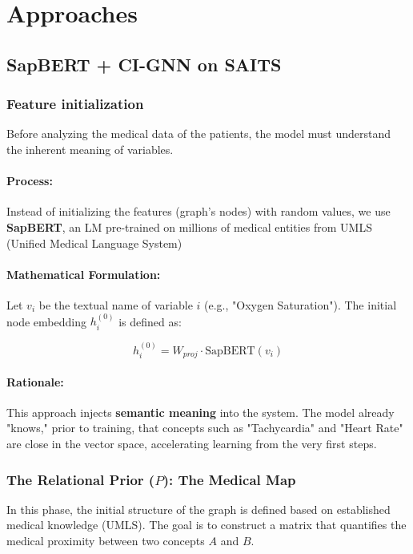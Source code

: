 \section{Approaches}

\subsection{SapBERT + CI-GNN on SAITS}

\subsubsection{Feature initialization}

Before analyzing the medical data of the patients, the model must understand the inherent meaning of variables.
\paragraph{Process:} Instead of initializing the features (graph's nodes) with random values, we use \textbf{SapBERT}, an LM pre-trained on millions of medical entities from UMLS (Unified Medical Language System) 


\paragraph{Mathematical Formulation:} Let $v_i$ be the textual name of variable $i$ (e.g., "Oxygen Saturation"). The initial node embedding $h_i^{(0)}$ is defined as:

\begin{equation}
h_i^{(0)} = W_{proj} \cdot \text{SapBERT}(v_i)
\end{equation}

\paragraph{Rationale:} This approach injects \textbf{semantic meaning} into the system. The model already "knows," prior to training, that concepts such as "Tachycardia" and "Heart Rate" are close in the vector space, accelerating learning from the very first steps.

\subsubsection{The Relational Prior ($P$): The Medical Map}

In this phase, the initial structure of the graph is defined based on established medical knowledge (UMLS). The goal is to construct a matrix that quantifies the medical proximity between two concepts $A$ and $B$.

